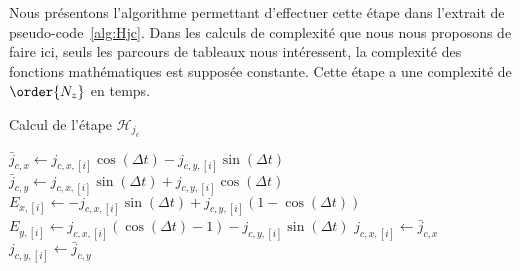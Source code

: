 Nous présentons l'algorithme permettant d'effectuer cette étape dans l'extrait de pseudo-code~\ref{alg:Hjc}. Dans les calculs de complexité que nous nous proposons de faire ici, seuls les parcours de tableaux nous intéressent, la complexité des fonctions mathématiques est supposée constante. Cette étape a une complexité de $\order{N_z}$ en temps.
\begin{algorithm}
  \caption{Calcul de l'étape $\mathcal{H}_{j_c}$}
  \label{alg:Hjc}
  \begin{algorithmic}[1]
        \State $\bar{j}_{c,x} \gets j_{c,x,[i]}\cos(\Delta t) - j_{c,y,[i]}\sin(\Delta t) $
        \State $\bar{j}_{c,y} \gets j_{c,x,[i]}\sin(\Delta t) + j_{c,y,[i]}\cos(\Delta t) $
        \State $E_{x,[i]}\gets -j_{c,x,[i]}\sin(\Delta t)     + j_{c,y,[i]}(1-\cos(\Delta t))$
        \State $E_{y,[i]}\gets  j_{c,x,[i]}(\cos(\Delta t)-1) - j_{c,y,[i]}\sin(\Delta t)$
        \State $j_{c,x,[i]} \gets \bar{j}_{c,x}$
        \State $j_{c,y,[i]} \gets \bar{j}_{c,y}$
      \EndFor
    \EndFunction
  \end{algorithmic}
\end{algorithm}


